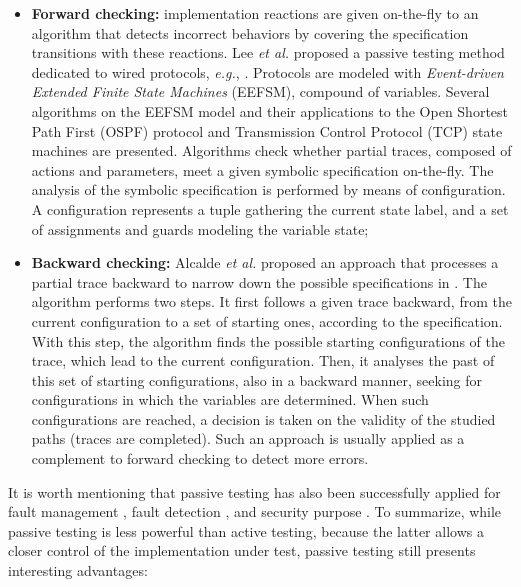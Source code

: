 \begin{itemize}
    \item \textbf{Forward checking:} implementation reactions are
        given on-the-fly to an algorithm that detects incorrect
        behaviors by covering the specification transitions with
        these reactions. Lee \emph{et al.} proposed a passive
        testing method dedicated to wired protocols, \emph{e.g.},
        \cite{1621118}. Protocols are modeled with
        \textit{Event-driven Extended Finite State Machines}
        (EEFSM), compound of variables.  Several algorithms on
        the EEFSM model and their applications to the Open
        Shortest Path First (OSPF) protocol and Transmission
        Control Protocol (TCP) state machines are presented.
        Algorithms check whether partial traces, composed of
        actions and parameters, meet a given symbolic
        specification on-the-fly. The analysis of the symbolic
        specification is performed by means of configuration. A
        configuration represents a tuple gathering the current
        state label, and a set of assignments and guards modeling
        the variable state;

    \item \textbf{Backward checking:} Alcalde \emph{et al.}
        proposed an approach that processes a partial trace
        backward to narrow down the possible specifications in
        \cite{alcalde2004network}. The algorithm performs two
        steps. It first follows a given trace backward, from the
        current configuration to a set of starting ones,
        according to the specification. With this step, the
        algorithm finds the possible starting configurations of
        the trace, which lead to the current configuration. Then,
        it analyses the past of this set of starting
        configurations, also in a backward manner, seeking for
        configurations in which the variables are determined.
        When such configurations are reached, a decision is taken
        on the validity of the studied paths (traces are
        completed). Such an approach is usually applied as a
        complement to forward checking to detect more errors.
\end{itemize}

It is worth mentioning that passive testing has also been
successfully applied for fault management \cite{965909}, fault
detection \cite{Ural:2007:IAP:1270230.1270259}, and security
purpose \cite{4698175}. To summarize, while passive testing is
less powerful than active testing, because the latter allows a
closer control of the implementation under test, passive testing
still presents interesting advantages:


